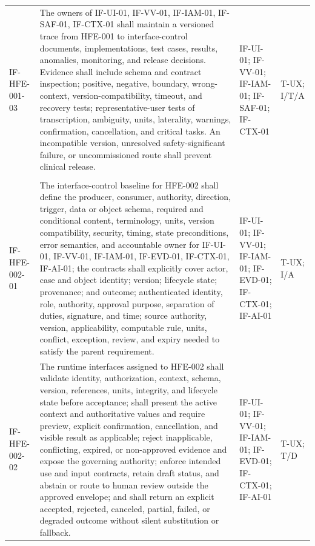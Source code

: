 \documentclass[11pt,letterpaper]{article}
\begin{document}
\begin{scriptsize}
\begin{longtable}{@{}L{0.14\textwidth}L{0.49\textwidth}L{0.19\textwidth}L{0.10\textwidth}@{}}
\addlinespace[2pt]
\mbox{IF-HFE-001-03} & The owners of IF-UI-01, IF-VV-01, IF-IAM-01, IF-SAF-01, IF-CTX-01 shall maintain a versioned trace from HFE-001 to interface-control documents, implementations, test cases, results, anomalies, monitoring, and release decisions. Evidence shall include schema and contract inspection; positive, negative, boundary, wrong-context, version-compatibility, timeout, and recovery tests; representative-user tests of transcription, ambiguity, units, laterality, warnings, confirmation, cancellation, and critical tasks. An incompatible version, unresolved safety-significant failure, or uncommissioned route shall prevent clinical release. & IF-UI-01; IF-VV-01; IF-IAM-01; IF-SAF-01; IF-CTX-01 & T-UX; I\slash\allowbreak{}T\slash\allowbreak{}A \\
\addlinespace[2pt]
 \\
\addlinespace[2pt]
\mbox{IF-HFE-002-01} & The interface-control baseline for HFE-002 shall define the producer, consumer, authority, direction, trigger, data or object schema, required and conditional content, terminology, units, version compatibility, security, timing, state preconditions, error semantics, and accountable owner for IF-UI-01, IF-VV-01, IF-IAM-01, IF-EVD-01, IF-CTX-01, IF-AI-01; the contracts shall explicitly cover actor, case and object identity; version; lifecycle state; provenance; and outcome; authenticated identity, role, authority, approval purpose, separation of duties, signature, and time; source authority, version, applicability, computable rule, units, conflict, exception, review, and expiry needed to satisfy the parent requirement. & IF-UI-01; IF-VV-01; IF-IAM-01; IF-EVD-01; IF-CTX-01; IF-AI-01 & T-UX; I\slash\allowbreak{}A \\
\addlinespace[2pt]
\mbox{IF-HFE-002-02} & The runtime interfaces assigned to HFE-002 shall validate identity, authorization, context, schema, version, references, units, integrity, and lifecycle state before acceptance; shall present the active context and authoritative values and require preview, explicit confirmation, cancellation, and visible result as applicable; reject inapplicable, conflicting, expired, or non-approved evidence and expose the governing authority; enforce intended use and input contracts, retain draft status, and abstain or route to human review outside the approved envelope; and shall return an explicit accepted, rejected, canceled, partial, failed, or degraded outcome without silent substitution or fallback. & IF-UI-01; IF-VV-01; IF-IAM-01; IF-EVD-01; IF-CTX-01; IF-AI-01 & T-UX; T\slash\allowbreak{}D \\

\end{longtable}
\end{scriptsize}
\end{document}
